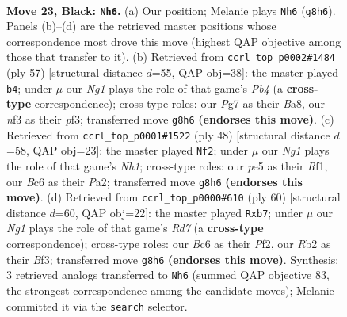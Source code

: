 \documentclass[11pt]{article}
\begin{document}
\clearpage

\begin{figure}[p]\centering
\begin{subfigure}{0.46\textwidth}\centering
\resizebox{\linewidth}{!}{%
\newchessgame
\chessboard[
  setfen={4k1nr/5ppp/2b5/P3P2P/8/5NK1/1r4P1/RN5R b k - 0 23},
  showmover=false,
  pgfstyle=straightmove, color=movearrow, markmove={g8-h6}
]}
\caption{}
\end{subfigure}\hfill
\begin{subfigure}{0.46\textwidth}\centering
\resizebox{\linewidth}{!}{%
\newchessgame
\chessboard[
  setfen={b5k1/p5pp/P7/1p1rNr2/8/4RP1P/6P1/4R1K1 b - - 0 29},
  showmover=false,
  pgfstyle=straightmove, color=movearrow, markmove={b5-b4}
]}
\caption{}
\end{subfigure}
\\[4pt]
\begin{subfigure}{0.46\textwidth}\centering
\resizebox{\linewidth}{!}{%
\newchessgame
\chessboard[
  setfen={1r4k1/p7/6p1/1p2p3/r2nP3/4B2P/Pb4PK/3R1R1N w - - 2 25},
  showmover=false,
  pgfstyle=straightmove, color=movearrow, markmove={h1-f2}
]}
\caption{}
\end{subfigure}\hfill
\begin{subfigure}{0.46\textwidth}\centering
\resizebox{\linewidth}{!}{%
\newchessgame
\chessboard[
  setfen={4r1k1/1p1R3p/4p2p/pP1p4/r3n3/5B1P/5PP1/4R1K1 w - - 2 31},
  showmover=false,
  pgfstyle=straightmove, color=movearrow, markmove={d7-b7}
]}
\caption{}
\end{subfigure}
\caption{\textbf{Move 23, Black: \texttt{Nh6}.} (a) Our position; Melanie plays \texttt{Nh6} (\texttt{g8h6}). Panels (b)--(d) are the retrieved master positions whose correspondence most drove this move (highest QAP objective among those that transfer to it). (b) Retrieved from \texttt{ccrl\_top\_p0002\#1484} (ply 57) [structural distance $d$=55, QAP obj=38]: the master played \texttt{b4}; under $\mu$ our \emph{Ng1} plays the role of that game's \emph{Pb4} (a \textbf{cross-type} correspondence); cross-type roles: our \emph{P}g7 as their \emph{B}a8, our \emph{n}f3 as their \emph{p}f3; transferred move \texttt{g8h6} \textbf{(endorses this move)}. (c) Retrieved from \texttt{ccrl\_top\_p0001\#1522} (ply 48) [structural distance $d$=58, QAP obj=23]: the master played \texttt{Nf2}; under $\mu$ our \emph{Ng1} plays the role of that game's \emph{Nh1}; cross-type roles: our \emph{p}e5 as their \emph{R}f1, our \emph{B}c6 as their \emph{P}a2; transferred move \texttt{g8h6} \textbf{(endorses this move)}. (d) Retrieved from \texttt{ccrl\_top\_p0000\#610} (ply 60) [structural distance $d$=60, QAP obj=22]: the master played \texttt{Rxb7}; under $\mu$ our \emph{Ng1} plays the role of that game's \emph{Rd7} (a \textbf{cross-type} correspondence); cross-type roles: our \emph{B}c6 as their \emph{P}f2, our \emph{R}b2 as their \emph{B}f3; transferred move \texttt{g8h6} \textbf{(endorses this move)}. Synthesis: 3 retrieved analogs transferred to \texttt{Nh6} (summed QAP objective 83, the strongest correspondence among the candidate moves); Melanie committed it via the \texttt{search} selector.}
\label{fig:thought-m45}
\end{figure}
\end{document}
